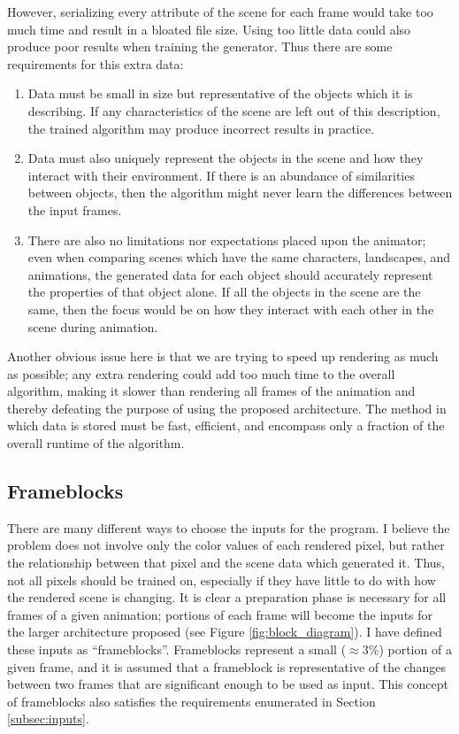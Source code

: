 \documentclass[conference]{IEEEtran}
\begin{document}
However, serializing every attribute of the scene for each frame would take too much time
and result in a bloated file size.
Using too little data could also produce poor results when training the
generator. Thus there are some requirements for this extra data:
\begin{enumerate}
\item Data must be small in size but representative of the objects which it is
describing. If any characteristics of the scene are left out of this
description, the trained algorithm may produce incorrect results in practice.
\item Data must also uniquely represent the objects in the scene and how they
interact with their environment.
If there is an abundance of similarities between objects, then
the algorithm might never learn the differences between the input frames.
\item There are also no limitations nor expectations placed upon the animator;
even when comparing scenes which have the same characters, landscapes, and
animations, the generated data for each object should accurately represent
the properties of that object alone. If all the objects in the scene are the
same, then the focus would be on how they interact with each other in the scene
during animation.
\end{enumerate}
Another obvious issue here is that we are trying to speed up rendering as much as possible;
any extra rendering could add too much time to the overall algorithm,
making it slower than rendering all frames of the animation
and thereby defeating the purpose of using the proposed architecture.
The method in which data is stored must be fast, efficient, and encompass only a fraction of the overall runtime of the algorithm.

\subsection{Frameblocks}
\label{subsec:frameblocks}
There are many different ways to choose the inputs for the program.
I believe the problem does not involve only the color values of each
rendered pixel,
but rather the relationship between that pixel and the scene data which
generated it. Thus, not all pixels should be trained on, especially if they have
little to do with how the rendered scene is changing.
It is clear a preparation phase is necessary for all frames of a given
animation; portions of each frame will become the inputs for the larger
architecture proposed (see Figure \ref{fig:block_diagram}).
I have defined these inputs as ``frameblocks''.
Frameblocks represent a small ($\approx 3\%$) portion of a given frame,
and it is assumed
that a frameblock is representative of the changes between
two frames that are significant enough to
be used as input.
This concept of frameblocks also satisfies the
requirements enumerated in Section \ref{subsec:inputs}.
\end{document}
